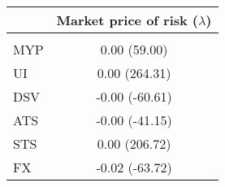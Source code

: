 \begin{table}
\centering
\begin{tabular}{l*{1}{c}}
\hline
& Market price of risk ($\lambda$)\\
\hline
\\
MYP & 0.00 (59.00)\\
UI & 0.00 (264.31)\\
DSV & -0.00 (-60.61)\\
ATS & -0.00 (-41.15)\\
STS & 0.00 (206.72)\\
FX & -0.02 (-63.72)\\
\hline
\end{tabular}
\end{table}
